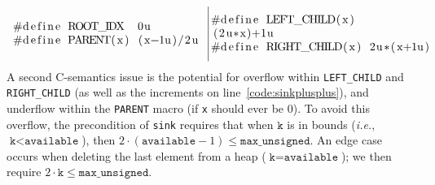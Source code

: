 \[
\begin{array}{@{}l@{~~}|@{~}l@{}}
\begin{minipage}{0.475\textwidth}
\begin{lstlisting}
#define ROOT_IDX  0u
#define PARENT(x) (x-1u)/2u
\end{lstlisting} \end{minipage} &
\begin{minipage}{0.5\textwidth}
\begin{lstlisting}[firstnumber=3]
#define LEFT_CHILD(x)  (2u*x)+1u
#define RIGHT_CHILD(x) 2u*(x+1u)
\end{lstlisting}
\end{minipage}
\end{array}
\]
A second C-semantics issue is the potential for overflow within \texttt{LEFT\_CHILD} and \texttt{RIGHT\_CHILD} (as well as the increments on line~\ref{code:sinkplusplus}), and underflow within the \texttt{PARENT} macro (if \texttt{x} should ever be 0).  To avoid this overflow, the precondition of \texttt{sink} requires that when $\texttt{k}$ is in bounds (\emph{i.e.}, $\texttt{k} < \texttt{available}$), then $2\cdot(\texttt{available}-1) \leq \texttt{max\_unsigned}$.  An edge case occurs when deleting the last element from a heap ($\texttt{k}=\texttt{available}$); we then require $2\cdot\texttt{k}\leq \texttt{max\_unsigned}$.

